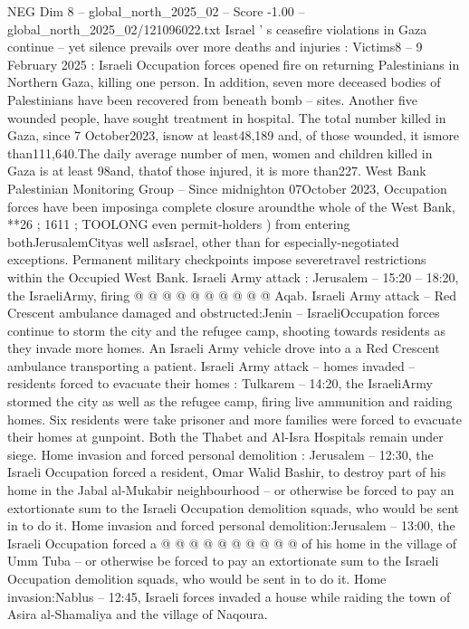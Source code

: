 \begin{textsample}{NEG Dim 8 – global\_north\_2025\_02 – Score -1.00 – global\_north\_2025\_02/121096022.txt}  \label{ex:f8_neg_143}
Israel ' s ceasefire violations in Gaza continue -- yet silence prevails over more deaths and injuries : Victims8 -- 9 February 2025 : Israeli Occupation forces opened fire on returning Palestinians in Northern Gaza, killing one person.
In addition, seven more deceased bodies of Palestinians have been recovered from beneath bomb -- sites.
Another five wounded people, have sought treatment in hospital.
The total number killed in Gaza, since 7 October2023, isnow at least48,189 and, of those wounded, it ismore than111,640.The daily average number of men, women and children killed in Gaza is at least 98and, thatof those injured, it is more than227.
West Bank Palestinian Monitoring Group -- Since midnighton 07October 2023, Occupation forces have been imposinga complete closure aroundthe whole of the West Bank, **26 ; 1611 ; TOOLONG even permit-holders ) from entering bothJerusalemCityas well asIsrael, other than for especially-negotiated exceptions.
Permanent military checkpoints impose severetravel restrictions within the Occupied West Bank.
Israeli Army attack : Jerusalem -- 15:20 -- 18:20, the IsraeliArmy, firing @ @ @ @ @ @ @ @ @ @ Aqab.
Israeli Army attack -- Red Crescent ambulance damaged and obstructed:Jenin -- IsraeliOccupation forces continue to storm the city and the refugee camp, shooting towards residents as they invade more homes.
An Israeli Army vehicle drove into a a Red Crescent ambulance transporting a patient.
Israeli Army attack -- homes invaded -- residents forced to evacuate their homes : Tulkarem -- 14:20, the IsraeliArmy stormed the city as well as the refugee camp, firing live ammunition and raiding homes.
Six residents were take prisoner and more families were forced to evacuate their homes at gunpoint.
Both the Thabet and Al-Isra Hospitals remain under siege.
Home invasion and forced personal demolition : Jerusalem -- 12:30, the Israeli Occupation forced a resident, Omar Walid Bashir, to destroy part of his home in the Jabal al-Mukabir neighbourhood -- or otherwise be forced to pay an extortionate sum to the Israeli Occupation demolition squads, who would be sent in to do it.
Home invasion and forced personal demolition:Jerusalem -- 13:00, the Israeli Occupation forced a @ @ @ @ @ @ @ @ @ @ of his home in the village of Umm Tuba -- or otherwise be forced to pay an extortionate sum to the Israeli Occupation demolition squads, who would be sent in to do it.
Home invasion:Nablus -- 12:45, Israeli forces invaded a house while raiding the town of Asira al-Shamaliya and the village of Naqoura.

\end{textsample}
